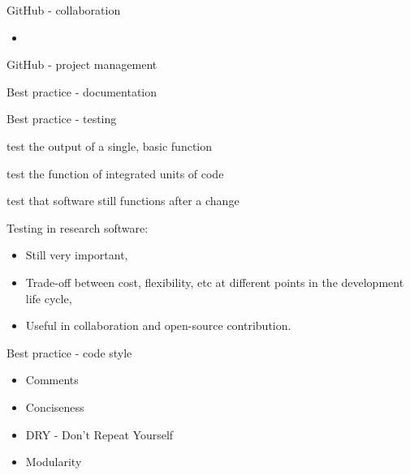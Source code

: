 \documentclass{beamer} %
\begin{document}
  \begin{frame}{GitHub - collaboration}
    \begin{itemize}
      \item 
    \end{itemize}
  \end{frame}

  \begin{frame}{GitHub - project management}
  \end{frame}

  \begin{frame}{Best practice - documentation}
  \end{frame}

  \begin{frame}[fragile]{Best practice - testing}
    \begin{tcolorbox}[skin=beamer,adjusted title=Unit Tests]
      test the output of a single, basic function
    \end{tcolorbox}
    
    \begin{tcolorbox}[skin=beamer,adjusted title=Integration Tests]
      test the function of integrated units of code
    \end{tcolorbox}
    
    \begin{tcolorbox}[skin=beamer,adjusted title=Regression Tests]
      test that software still functions after a change
    \end{tcolorbox}
    
    \tiny
    Testing in research software:
    \begin{itemize}
      \item Still very important,
      \item Trade-off between cost, flexibility, etc at different points in the development life cycle,
      \item Useful in collaboration and open-source contribution.
    \end{itemize}
  \end{frame}

  \begin{frame}{Best practice - code style}
    \pause
    \begin{itemize}
      \item Comments
      \item Conciseness
      \item DRY - Don't Repeat Yourself
      \item Modularity
    \end{itemize}
  \end{frame}
\end{document}

